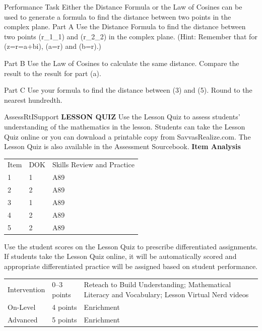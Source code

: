 \documentclass{article}
\newenvironment{practice}[2]{}{}        %
\newenvironment{te-addendum}[2]{}{}     %
\newcommand{\answer}[1]{}               %
\newcommand{\placeholder}[2]{}          %
\newcommand{\te}[1]{}                   %
\begin{document}
\begin{practice}{44}{2}
Performance Task Either the Distance Formula or the Law of Cosines can be used to generate a formula to find the distance between two points in the complex plane.
Part A Use the Distance Formula to find the distance between two points (r_1\theta_1) and (r_2\theta_2) in the complex plane. (Hint: Remember that for (z=r\theta=a+bi), (a=r\cos\theta) and (b=r\sin\theta).)
\answer{Part A (d=\sqrt{(r_1)^2+(r_2)^2-2r_1r_2\cos(\theta_2-\theta_1)})}
Part B Use the Law of Cosines to calculate the same distance. Compare the result to the result for part (a).
\placeholder{diagram}{Unlabeled black double-arrowed perpendicular axes, no grid/ticks. Blue ray segment r1 from O northeast; longer red segment r2 from O northwest. Dashed green segment c joins tips. Blue angle arc theta1 from positive horizontal axis to r1, larger red theta2 arc from positive horizontal axis to r2, green included angle C between r1 and r2 with leader from lower-left label C.}
\answer{Part B Yes, you get the same formula: (d=\sqrt{(r_1)^2+(r_2)^2-2r_1r_2\cos(\theta_2-\theta_1)})}
Part C Use your formula to find the distance between (3\frac{}) and (5\pi). Round to the nearest hundredth.
\answer{Part C 7.74}
\end{practice}
\begin{te-addendum}{Assess}{RtISupport}
\textbf{LESSON QUIZ}
Use the Lesson Quiz to assess students' understanding of the mathematics in the lesson.
Students can take the Lesson Quiz online or you can download a printable copy from SavvasRealize.com. The Lesson Quiz is also available in the Assessment Sourcebook.
\textbf{Item Analysis}
\begin{tabular}{lll}
Item & DOK & Skills Review and Practice \\
1 & 1 & A89 \\
2 & 2 & A89 \\
3 & 1 & A89 \\
4 & 2 & A89 \\
5 & 2 & A89 \\
\end{tabular}
Use the student scores on the Lesson Quiz to prescribe differentiated assignments.
If students take the Lesson Quiz online, it will be automatically scored and appropriate differentiated practice will be assigned based on student performance.
\begin{tabular}{lll}
Intervention & 0--3 points & Reteach to Build Understanding; Mathematical Literacy and Vocabulary; Lesson Virtual Nerd videos \\
On-Level & 4 points & Enrichment \\
Advanced & 5 points & Enrichment \\
\end{tabular}
\te{Assessment. Lesson Quiz is available at SavvasRealize.com.}
\end{te-addendum}
\end{document}
